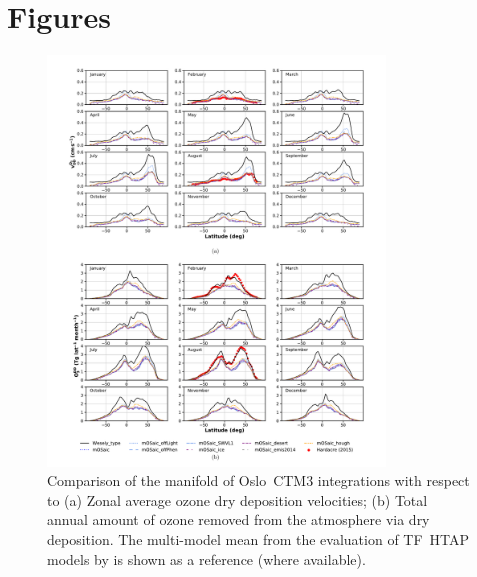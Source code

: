 \documentclass[gmd, manuscript]{copernicus}
\begin{document}










\appendix
\section{Figures}    %

\appendixfigures
\begin{figure}[!htbp]
  \includegraphics[width=0.8\textwidth]{fig10}
  \caption{Comparison of the manifold of Oslo~CTM3 integrations with respect to (a) Zonal average ozone dry deposition velocities; (b) Total annual amount of ozone removed from the atmosphere via dry deposition. The multi-model mean from the evaluation of TF~HTAP models by \citet{ACP:Hardacre2015} is shown as a reference (where available).}
  \label{fig:mmm_drydep_season}
\end{figure}
\end{document}
